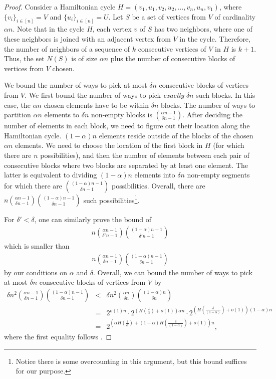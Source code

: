 \begin{proof}
  Consider a Hamiltonian cycle $H=(v_1,u_1,v_2,u_2,\ldots, v_n,u_n,v_1)$, where $\{v_i\}_{i\in [n]}=V$ and $\{u_i\}_{i\in [n]}=U$. Let $S$ be
%
a  %
set of vertices from $V$ of cardinality $\alpha n$. Note that in the cycle $H$, each vertex $v$ of $S$ has two neighbors, where one of these neighbors is joined with  an adjacent vertex from $V$ in the cycle. Therefore, the number of neighbors of a sequence of $k$ consecutive vertices of $V$ in $H$ is $k+1$. Thus, the set $N(S)$ is of size $\alpha n$ plus the number of consecutive blocks of vertices from $V$ chosen.
	
	We bound the number of ways to pick at most $\delta n$ consecutive blocks of vertices from $V$. We first bound the number of ways to pick \emph{exactly} $\delta n$ such blocks.
	In this case, the $\alpha n$ chosen elements have to be within $\delta n$ blocks. The number of ways to partition $\alpha n$ elements to $\delta n$
non-empty %
blocks is $\binom{\alpha n - 1}{\delta n - 1}$. After deciding the number of elements in each block, we need to figure out their  location along the Hamiltonian cycle. $(1-\alpha)n$ elements reside outside of the blocks of 
the  %
chosen $\alpha n$ elements. We need to %
choose  %
the location of the first block in $H$ (for which there are $n$ possibilities), and then the number of %
elements   %
%
between each pair of consecutive blocks %
where two blocks are separated by at least one element. The latter is equivalent to %
%
dividing %
$(1-\alpha)n$ elements into $\delta n$ 
non-empty  %
%
%
segments   %
for which there are $\binom{(1-\alpha)n-1}{\delta n - 1}$ possibilities. Overall, there are $n\binom{\alpha n - 1}{\delta n - 1}\binom{(1-\alpha)n-1}{\delta n - 1}$ such possibilities\footnote{Notice
%
%
there is  %
some %
overcounting  %
in this argument, but this bound suffices for our purpose.}.
	
	For $\delta'< \delta$, one can similarly prove the bound of 
	\begin{eqnarray}
		n\binom{\alpha n - 1}{\delta' n - 1}\binom{(1-\alpha)n-1}{\delta' n - 1}
	\end{eqnarray}
	which is smaller than 
	\begin{eqnarray}
		n\binom{\alpha n - 1}{\delta n - 1}\binom{(1-\alpha)n-1}{\delta n - 1}
	\end{eqnarray} by our conditions on $\alpha$ and $\delta$. Overall, we can bound the number of ways to pick at most $\delta n$ consecutive blocks of vertices from $V$ by
	\begin{eqnarray}
		\delta n^2\binom{\alpha n - 1}{\delta n - 1}\binom{(1-\alpha)n-1}{\delta n - 1} & < & \delta n^2\binom{\alpha n}{\delta n}\binom{(1-\alpha)n}{\delta n}\\
		&=& 2^{o(1)n}\cdot 2^{(H(\frac{\delta}{ \alpha})+o(1))\alpha n}\cdot 2^{(H(\frac{\delta} {(1-\alpha)})+o(1))(1-\alpha) n}\\
		& = &2^{(\alpha H(\frac{\delta}{ \alpha})+(1-\alpha)H(\frac{\delta} {(1-\alpha)})+o(1))n},
	\end{eqnarray}
	where the first equality follows .
\end{proof}

